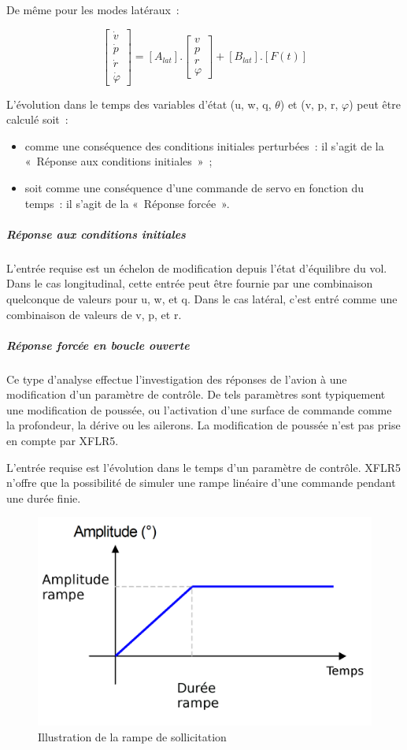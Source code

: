 \documentclass[a4paper,twoside,12pt,dvips]{article}
\begin{document}
De même pour les modes latéraux~:

$$\left[\begin{matrix} \dot{v} \\ \dot{p} \\ \dot{r} \\ \dot{\varphi}
\end{matrix}\right] = \left[A_{lat}\right] . \left[\begin{matrix} v \\ p \\ r \\ \varphi \end{matrix}\right] + \left[B_{lat}\right] . \left[F(t)\right]$$

L’évolution dans le temps des variables d’état (u, w, q, $\theta$) et (v, p, r,
$\varphi$) peut être calculé soit~:
\begin{itemize}
	\item comme une conséquence des conditions initiales perturbées~: il s’agit
	de la «~Réponse aux conditions initiales~»~;
	\item soit comme une conséquence d’une commande de servo en fonction du 
	temps~: il s’agit de la «~Réponse forcée~».
\end{itemize}

\subparagraph{Réponse aux conditions initiales}

L’entrée requise est un échelon de modification depuis l’état d’équilibre du vol. Dans le cas longitudinal, cette entrée peut être fournie par une combinaison quelconque de valeurs pour u, w, et q. Dans le cas latéral, c’est entré comme une combinaison de valeurs de v, p, et r.

\subparagraph{Réponse forcée en boucle ouverte}

Ce type d’analyse effectue l’investigation des réponses de l’avion à une modification d’un paramètre de contrôle. De tels paramètres sont typiquement une
modification de poussée, ou l’activation d’une surface de commande comme la profondeur, la dérive ou les ailerons. La  modification de poussée n’est pas prise en compte par XFLR5.

L’entrée requise est l’évolution dans le temps d’un paramètre de contrôle. XFLR5 n’offre que la possibilité de simuler une rampe linéaire d’une commande pendant une durée finie.

\begin{figure}[htbp]
	\centering
	\includegraphics[width=0.8\linewidth]{img-49-fr}
	\caption{Illustration de la rampe de sollicitation}
	\label{img:rampe sollicitation}
\end{figure}
\end{document}
